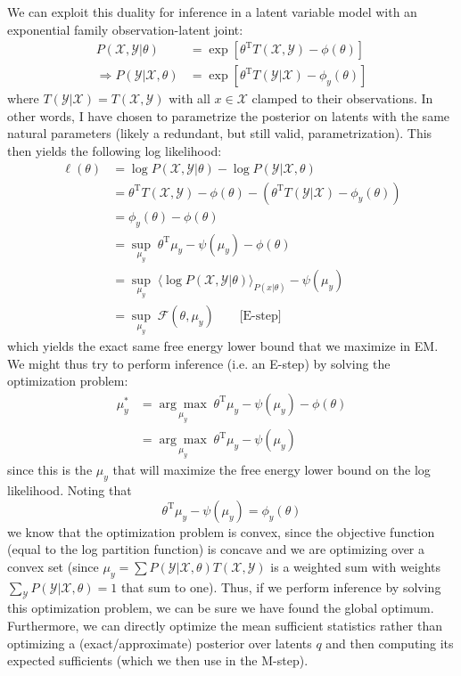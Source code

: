 \documentclass[a4paper]{article}
\begin{document}
We can exploit this duality for inference in a latent variable model with an exponential family observation-latent joint:
\begin{align*}
P(\mathcal{X},\mathcal{Y}|\theta) &= \exp[\theta^\textrm{T}T(\mathcal{X},\mathcal{Y}) - \phi(\theta)] \\
\Rightarrow P(\mathcal{Y}|\mathcal{X},\theta) &= \exp[\theta^\textrm{T}T(\mathcal{Y}|\mathcal{X}) - \phi_y(\theta)]
\end{align*}
where $T(\mathcal{Y}|\mathcal{X}) = T(\mathcal{X},\mathcal{Y})$ with all $x\in\mathcal{X}$ clamped to their observations. In other words, I have chosen to parametrize the posterior on latents with the same natural parameters (likely a redundant, but still valid, parametrization). This then yields the following log likelihood:
\begin{align*}
\ell(\theta) &= \log P(\mathcal{X},\mathcal{Y}|\theta) - \log P(\mathcal{Y}|\mathcal{X},\theta) \\
&= \theta^\textrm{T}T(\mathcal{X},\mathcal{Y}) - \phi(\theta) - (\theta^\textrm{T}T(\mathcal{Y}|\mathcal{X}) - \phi_y(\theta)) \\
&= \phi_y(\theta) - \phi(\theta) \\
&= \underset{\mu_y}{\sup}\; \theta^\textrm{T}\mu_y - \psi(\mu_y) - \phi(\theta) \\
&= \underset{\mu_y}{\sup}\; \langle \log P(\mathcal{X},\mathcal{Y}|\theta) \rangle_{P(x|\theta)} - \psi(\mu_y) \\
&= \underset{\mu_y}{\sup}\; \mathcal{F}(\theta,\mu_y) \quad\quad \text{[E-step]}
\end{align*}
which yields the exact same free energy lower bound that we maximize in EM. We might thus try to perform inference (i.e. an E-step) by solving the optimization problem:
\begin{align*}
\mu_y^* &= \underset{\mu_y}{\arg\max}\; {\theta}^\textrm{T}\mu_y - \psi(\mu_y) - \phi(\theta) \\
&= \underset{\mu_y}{\arg\max}\; \theta^\textrm{T}\mu_y - \psi(\mu_y)
\end{align*}
since this is the $\mu_y$ that will maximize the free energy lower bound on the log likelihood. Noting that
\[ \theta^\textrm{T}\mu_y - \psi(\mu_y) = \phi_y(\theta) \]
we know that the optimization problem is convex, since the objective function (equal to the log partition function) is concave  and we are optimizing over a convex set (since $\mu_y = \sum P(\mathcal{Y}|\mathcal{X},\theta) T(\mathcal{X,Y})$ is a weighted sum with weights $\sum_\mathcal{Y} P(\mathcal{Y}|\mathcal{X},\theta) = 1$ that sum to one). Thus, if we perform inference by solving this optimization problem, we can be sure we have found the global optimum. Furthermore, we can directly optimize the mean sufficient statistics rather than optimizing a (exact/approximate) posterior over latents $q$ and then computing its expected sufficients (which we then use in the M-step).
\end{document}
